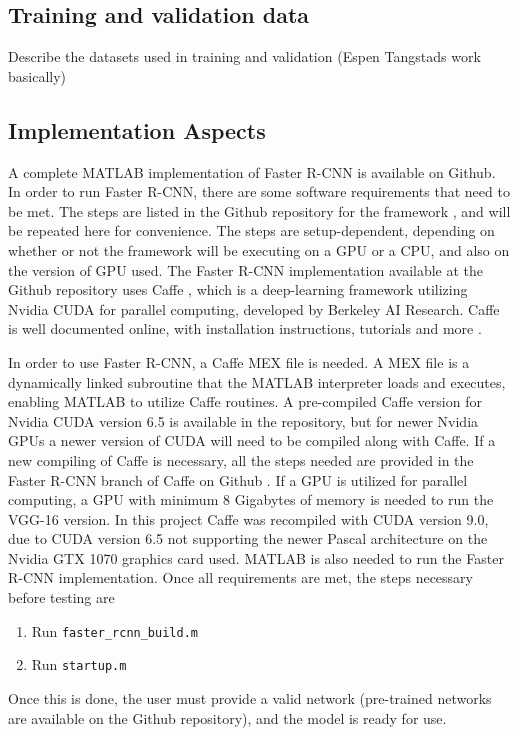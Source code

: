\subsection{Training and validation data}
Describe the datasets used in training and validation (Espen Tangstads work basically) 
\subsection{Implementation Aspects}
A complete MATLAB implementation of Faster R-CNN is available on Github. In order to run Faster R-CNN, there are some software requirements that need to be met. The steps are listed in the Github repository for the framework \cite{faster_rcnn_git}, and will be repeated here for convenience. The steps are setup-dependent, depending on whether or not the framework will be executing on a GPU or a CPU, and also on the version of GPU used. The Faster R-CNN implementation available at the Github repository uses Caffe \cite{jia2014caffe}, which is a deep-learning framework utilizing Nvidia CUDA for parallel computing, developed by Berkeley AI Research. Caffe is well documented online, with installation instructions, tutorials and more \cite{caffe}. 

In order to use Faster R-CNN, a Caffe MEX file is needed. A MEX file is a dynamically linked subroutine that the MATLAB interpreter loads and executes, enabling MATLAB to utilize Caffe routines. A pre-compiled Caffe version for Nvidia CUDA version 6.5 is available in the repository, but for newer Nvidia GPUs a newer version of CUDA will need to be compiled along with Caffe. If a new compiling of Caffe is necessary, all the steps needed are provided in the Faster R-CNN branch of Caffe on Github \cite{caffe_for_faster_rcnn}. If a GPU is utilized for parallel computing, a GPU with minimum 8 Gigabytes of memory is needed to run the VGG-16 version. In this project Caffe was recompiled with CUDA version 9.0, due to CUDA version 6.5 not supporting the newer Pascal architecture on the Nvidia GTX 1070 graphics card used. MATLAB is also needed to run the Faster R-CNN implementation. Once all requirements are met, the steps necessary before testing are
\begin{enumerate}
	\item Run \lstinline[basicstyle=\ttfamily]{faster_rcnn_build.m}
	\item Run \lstinline[basicstyle=\ttfamily]{startup.m}
\end{enumerate}
Once this is done, the user must provide a valid network (pre-trained networks are available on the Github repository), and the model is ready for use.
